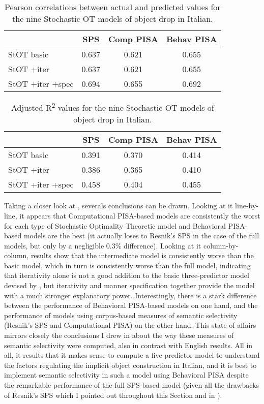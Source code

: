 \begin{table}[htb] %
\caption{Pearson correlations between actual and predicted values for the nine Stochastic OT models of object drop in Italian.}
\begin{tabular}{l|ccc}
& SPS & Comp PISA & Behav PISA \\
\hline
StOT basic           & 0.637        & 0.621     & 0.655      \\
StOT +iter           & 0.637        & 0.621     & 0.655      \\
StOT +iter +spec     & 0.694        & 0.655     & 0.692     
\end{tabular}
\end{table}

\begin{table}[htb] %
\caption{Adjusted R\textsuperscript{2} values for the nine Stochastic OT models of object drop in Italian.}
\begin{tabular}{l|ccc}
& SPS & Comp PISA & Behav PISA \\
\hline
StOT basic           & 0.391        & 0.370     & 0.414      \\
StOT +iter           & 0.386        & 0.365     & 0.410      \\
StOT +iter +spec     & 0.458        & 0.404     & 0.455     
\end{tabular}
\end{table}

Taking a closer look at , severals conclusions can be drawn. Looking at it line-by-line, it appears that Computational PISA-based models are consistently the worst for each type of Stochastic Optimality Theoretic model and Behavioral PISA-based models are the best (it actually loses to Resnik's SPS in the case of the full models, but only by a negligible 0.3\% difference). Looking at it column-by-column, results show that the intermediate model is consistently worse than the basic model, which in turn is consistently worse than the full model, indicating that iterativity alone is not a good addition to the basic three-predictor model devised by \textcite{Medina2007}, but iterativity and manner specification together provide the model with a much stronger explanatory power. Interestingly, there is a stark difference between the performance of Behavioral PISA-based models on one hand, and the performance of models using corpus-based measures of semantic selectivity (Resnik's SPS and Computational PISA) on the other hand. This state of affairs mirrors closely the conclusions I drew in  about the way these measures of semantic selectivity were computed, also in contrast with English results. All in all, it results that it makes sense to compute a five-predictor model to understand the factors regulating the implicit object construction in Italian, and it is best to implement semantic selectivity in such a model using Behavioral PISA despite the remarkable performance of the full SPS-based model (given all the drawbacks of Resnik's SPS which I pointed out throughout this Section and in ).

